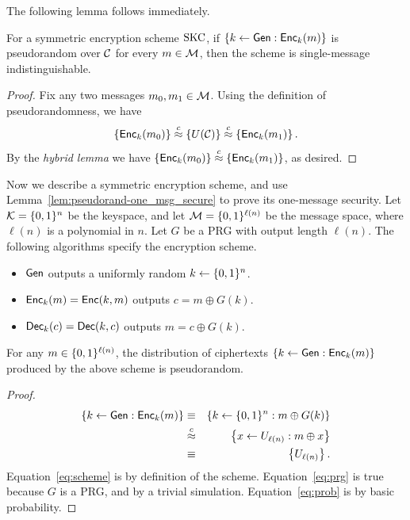 \documentclass[11pt]{article}
\begin{document}
The following lemma follows immediately. 

\begin{lemma}
  \label{lem:pseudorand-one_msg_secure}
  For a symmetric encryption scheme $\text{SKC}$, if $\{k \gets \mathsf{Gen} :
    \mathsf{Enc}_k(m)\}$ is pseudorandom over $\mathcal{C}$ for every $m \in
  \mathcal{M}$, then the scheme is single-message indistinguishable.
\end{lemma}

\begin{proof}
  Fix any two messages $m_0, m_1 \in \mathcal{M}$.  Using the definition
  of pseudorandomness, we have
  \[ \left\{ \mathsf{Enc}_k(m_0) \right\} \stackrel{c}{\approx} \left\{ U(\mathcal{C})
  \right\} \stackrel{c}{\approx} \left\{ \mathsf{Enc}_k(m_1) \right\}. \] By the
  \emph{hybrid lemma} we have $ \left\{ \mathsf{Enc}_k(m_0) \right\}
  \stackrel{c}{\approx} \left\{ \mathsf{Enc}_k(m_1) \right\}$, as desired.
\end{proof}

Now we describe a symmetric encryption scheme, and use
Lemma~\ref{lem:pseudorand-one_msg_secure} to prove its one-message
security.  Let $\mathcal{K} = \{0,1\}^n$ be the keyspace, and let
$\mathcal{M} = \{0,1\}^{\ell(n)}$ be the message space, where $\ell(n)$ is
a polynomial in $n$.  Let $G$ be a PRG with output length $\ell(n)$.
The following algorithms specify the encryption scheme.
\begin{itemize}
\item $\mathsf{Gen}$ outputs a uniformly random $k \gets \{0,1\}^{n}$.
\item $\mathsf{Enc}_k(m) = \mathsf{Enc}(k,m)$ outputs $c = m \oplus G(k)$.
\item $\mathsf{Dec}_k(c) = \mathsf{Dec}(k, c)$ outputs $m = c \oplus G(k)$.
\end{itemize}

\begin{claim}
  For any $m \in \{0,1\}^{\ell(n)}$, the distribution of ciphertexts
  $\left\{ k \gets \mathsf{Gen} : \mathsf{Enc}_k(m) \right\}$ produced by the
  above scheme is pseudorandom.
\end{claim}

\begin{proof}
  \begin{eqnarray}
    \left\{ k \gets \mathsf{Gen} : \mathsf{Enc}_k(m) \right\} & \equiv &
    \left\{ k \gets \{0,1\}^{n} : m \oplus G(k) \right\} \label{eq:scheme} \\
    & \stackrel{c}{\approx} & \left\{ x \gets U_{\ell(n)} : m \oplus x
    \right\} \label{eq:prg} \\
    & \equiv & \left\{ U_{\ell(n)} \right\}. \label{eq:prob}
  \end{eqnarray}
  Equation~\eqref{eq:scheme} is by definition of the scheme.
  Equation~\eqref{eq:prg} is true because $G$ is a PRG, and by a
  trivial simulation.  Equation~\eqref{eq:prob} is by basic
  probability.
\end{proof}
\end{document}
